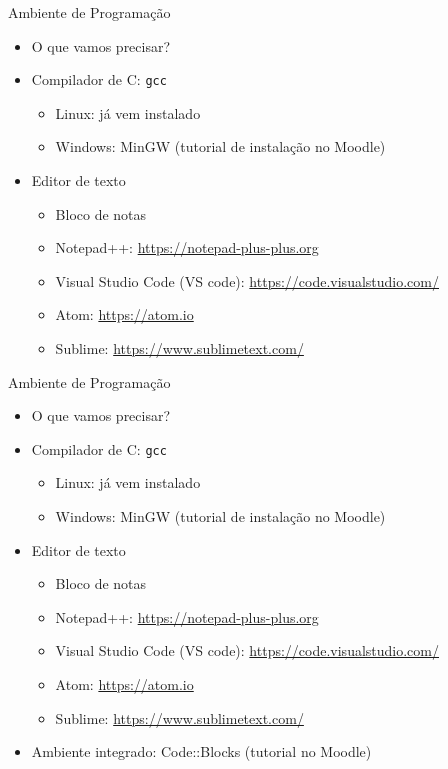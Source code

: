 \documentclass[t, aspectratio=169]{beamer}
\begin{document}
\begin{frame}[label={sec:orgd3a9a29},fragile]{Ambiente de Programação}
 \begin{itemize}
\item O que vamos precisar?

\item Compilador de C: \texttt{gcc}
\begin{itemize}
\item Linux: já vem instalado
\item Windows: MinGW (tutorial de instalação no Moodle)
\end{itemize}

\item Editor de texto
\begin{itemize}
\item Bloco de notas
\item Notepad++: \url{https://notepad-plus-plus.org}
\item Visual Studio Code (VS code): \url{https://code.visualstudio.com/}
\item Atom: \url{https://atom.io}
\item Sublime: \url{https://www.sublimetext.com/}
\end{itemize}
\end{itemize}
\end{frame}

\begin{frame}[label={sec:org1109d99},fragile]{Ambiente de Programação}
 \begin{itemize}
\item O que vamos precisar?

\item Compilador de C: \texttt{gcc}
\begin{itemize}
\item Linux: já vem instalado
\item Windows: MinGW (tutorial de instalação no Moodle)
\end{itemize}

\item Editor de texto
\begin{itemize}
\item Bloco de notas
\item Notepad++: \url{https://notepad-plus-plus.org}
\item Visual Studio Code (VS code): \url{https://code.visualstudio.com/}
\item Atom: \url{https://atom.io}
\item Sublime: \url{https://www.sublimetext.com/}
\end{itemize}

\item Ambiente integrado: Code::Blocks (tutorial no Moodle)
\end{itemize}
\end{frame}
\end{document}
